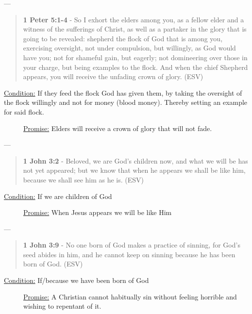 \documentclass[11pt]{article}
\begin{document}
---

\begin{quote}
\textbf{1 Peter 5:1-4} - So I exhort the elders among you, as a fellow elder and a witness of the sufferings of Christ, as well as a partaker in the glory that is going to be revealed: shepherd the flock of God that is among you, exercising oversight, not under compulsion, but willingly, as God would have you; not for shameful gain, but eagerly; not domineering over those in your charge, but being examples to the flock. And when the chief Shepherd appears, you will receive the unfading crown of glory. (ESV)
\end{quote}

\begin{description}
\item[{\uline{Condition:} If they feed the flock God has given them, by taking the oversight of the flock willingly and not for money (blood money). Thereby setting an example for said flock.}] \uline{Promise:} Elders will receive a crown of glory that will not fade.
\end{description}

---

\begin{quote}
\textbf{1 John 3:2} - Beloved, we are God's children now, and what we will be has not yet appeared; but we know that when he appears we shall be like him, because we shall see him as he is. (ESV)
\end{quote}

\begin{description}
\item[{\uline{Condition:} If we are children of God}] \uline{Promise:} When Jesus appears we will be like Him
\end{description}

---

\begin{quote}
\textbf{1 John 3:9} - No one born of God makes a practice of sinning, for God's seed abides in him, and he cannot keep on sinning because he has been born of God. (ESV)
\end{quote}

\begin{description}
\item[{\uline{Condition:} If/because we have been born of God}] \uline{Promise:} A Christian cannot habitually sin without feeling horrible and wishing to repentant of it.
\end{description}
\end{document}
